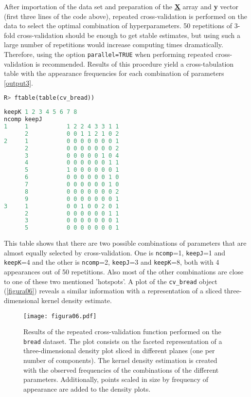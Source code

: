 After importation of the data set and preparation of the \textbf{\underline{X}} array and \textbf{y} vector (first three lines of the code above), repeated cross-validation is performed on the data to select the optimal combination of hyperparameters. 50 repetitions of 3-fold cross-validation should be enough to get stable estimates, but using such a large number of repetitions would increase computing times dramatically. Therefore, using the option \texttt{parallel=TRUE} when performing repeated cross-validation is recommended. Results of this procedure yield a cross-tabulation table with the appearance frequencies for each combination of parameters \autoref{output3}.

\vspace{15pt}
\begin{lstlisting}[basicstyle=\small, language=Python, morekeywords={ftable, table}]
R> ftable(table(cv_bread)) 
\end{lstlisting}

\begin{lstlisting}[basicstyle=\small, backgroundcolor=\color{output}, numbers=none, label={output3}, language=Python, caption=\texttt{repeat\_cv} results for the \texttt{bread} data set.]
            keepK 1 2 3 4 5 6 7 8
ncomp keepJ                      
1     1           1 2 2 4 3 3 1 1
      2           0 0 1 1 2 1 0 2
2     1           0 0 0 0 0 0 0 1
      2           0 0 0 0 0 0 0 2
      3           0 0 0 0 0 1 0 4
      4           0 0 0 0 0 0 1 1
      5           1 0 0 0 0 0 0 1
      6           0 0 0 0 0 0 1 0
      7           0 0 0 0 0 0 1 0
      8           0 0 0 0 0 0 0 2
      9           0 0 0 0 0 0 0 1
3     1           0 0 1 0 0 2 0 1
      2           0 0 0 0 0 0 1 1
      3           0 0 0 0 0 0 0 1
      5           0 0 0 0 0 0 0 1
\end{lstlisting}    
      
This table shows that there are two possible combinations of parameters that are almost equally selected by cross-validation. One is \texttt{ncomp}=1, \texttt{keepJ}=1 and \texttt{keepK}=4 and the other is \texttt{ncomp}=2, \texttt{keepJ}=3 and \texttt{keepK}=8, both with 4 appearances out of 50 repetitions. Also most of the other combinations are close to one of these two mentioned 'hotspots'. A plot of the \texttt{cv\_bread} object (\autoref{figura06}) reveals a similar information with a representation of a sliced three-dimensional kernel density estimate.


\begin{figure}[!ht]
	\centering
\texttt{[image: figura06.pdf]}
\caption[Results of the repeated cross-validation function performed on the \texttt{bread} dataset]{Results of the repeated cross-validation function performed on the \texttt{bread} dataset. The plot consists on the faceted representation of a three-dimensional density plot sliced in different planes (one per number of components). The kernel density estimation is created with the observed frequencies of the combinations of the different parameters. Additionally, points scaled in size by frequency of appearance are added to the density plots.}
\label{figura06}
\end{figure}

